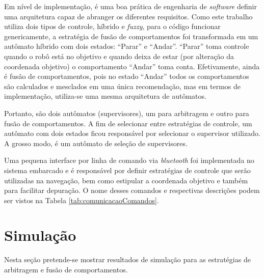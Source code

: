 	Em nível de implementação, é uma boa prática de engenharia de \textit{software} definir
	uma arquitetura capaz de abranger os diferentes requisitos. Como este trabalho utiliza 
	dois tipos de controle, híbrido e \textit{fuzzy}, para o código funcionar genericamente, 
	a estratégia de fusão de comportamentos foi transformada em um autômato híbrido com dois 
	estados: ``Parar'' e ``Andar''. ``Parar'' toma controle quando o robô está no objetivo e 
	quando deixa de estar (por alteração da coordenada objetivo) o comportamento ``Andar'' 
	toma conta. Efetivamente, ainda é fusão de comportamentos, pois no estado ``Andar'' todos 
	os comportamentos são calculados e mesclados em uma única recomendação, mas em termos de 
	implementação, utiliza-se uma mesma arquitetura de autômatos.
	
	Portanto, são dois autômatos (supervisores), um para arbitragem e outro para fusão de 
	comportamentos. A fim de selecionar entre estratégias de controle, um autômato com dois
	estados ficou responsável por selecionar o supervisor utilizado. A grosso modo, é um 
	autômato de seleção de supervisores. 
	
	Uma pequena interface por linha de comando via \textit{bluetooth} foi implementada no 
	sistema embarcado e é responsável por definir estratégias de controle que serão utilizadas 
	na navegação, bem como estipular a coordenada objetivo e também para facilitar depuração. 
	O nome desses comandos e respectivas descrições podem ser vistos na Tabela 
	\ref{tab:comunicacaoComandos}. 
	
	
	
	
	
	
	
\section{Simulação}

	Nesta seção pretende-se mostrar resultados de simulação para as estratégias de 
	arbitragem e fusão de comportamentos. 
	
